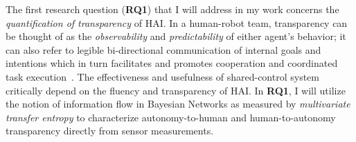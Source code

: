\documentclass[12pt]{article}
\renewcommand{\sout}[1]{\unskip}
\begin{document}
The first research question (\textbf{RQ1}) that I will address in my work concerns the \textit{quantification of transparency} of HAI. In a human-robot team, transparency can be thought of as the \textit{observability} and \textit{predictability} of either agent's behavior; it can also refer to legible bi-directional communication of internal goals and intentions which in turn facilitates and promotes cooperation and coordinated task execution~\cite{kiesler2005fostering}. The effectiveness and usefulness of shared-control system critically depend on the fluency and transparency of HAI. In \textbf{RQ1}, I will utilize the notion of information flow in Bayesian Networks as measured by \textit{multivariate transfer entropy} to characterize autonomy-to-human and human-to-autonomy transparency directly from sensor measurements. \sout{Transfer entropy is an information-theoretic metric that aims to capture the \textit{directed information flow/transfer} from a source random process to a target random process~\cite{schreiber2000measuring}. Higher transfer entropy implies that knowledge of the source process's past state improves the predictability of the target process's future state. Our hypothesis is that in a joint task setting, if the robot behavior is more transparent to the human, the information regarding the autonomy's intention will be utilized properly by the human, who will then likely act in a more predictable manner to achieve the joint task. In such cases, transfer entropy can become a viable metric to capture the increase in predictability caused by higher transparency. }
\end{document}
